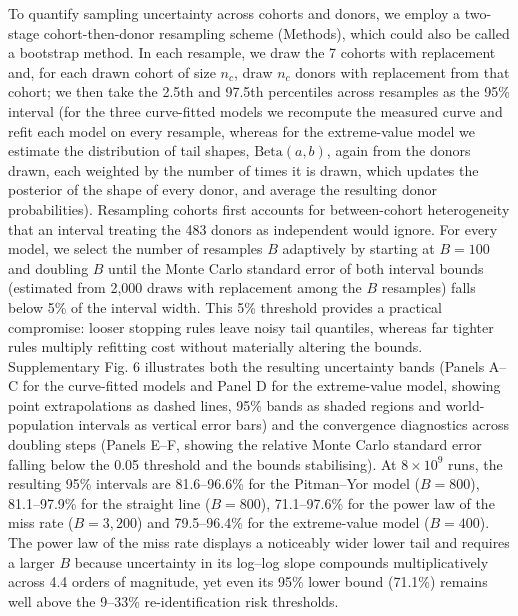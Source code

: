 \documentclass[11pt,a4paper]{article}
\begin{document}
To quantify sampling uncertainty across cohorts and donors, we employ a two-stage cohort-then-donor resampling scheme (Methods), which could also be called a bootstrap method. In each resample, we draw the 7 cohorts with replacement and, for each drawn cohort of size $n_c$, draw $n_c$ donors with replacement from that cohort; we then take the 2.5th and 97.5th percentiles across resamples as the 95\% interval (for the three curve-fitted models we recompute the measured curve and refit each model on every resample, whereas for the extreme-value model we estimate the distribution of tail shapes, $\mathrm{Beta}(a, b)$, again from the donors drawn, each weighted by the number of times it is drawn, which updates the posterior of the shape of every donor, and average the resulting donor probabilities). Resampling cohorts first accounts for between-cohort heterogeneity that an interval treating the 483 donors as independent would ignore. For every model, we select the number of resamples $B$ adaptively by starting at $B = 100$ and doubling $B$ until the Monte Carlo standard error of both interval bounds (estimated from 2,000 draws with replacement among the $B$ resamples) falls below 5\% of the interval width. This 5\% threshold provides a practical compromise: looser stopping rules leave noisy tail quantiles, whereas far tighter rules multiply refitting cost without materially altering the bounds. Supplementary Fig. 6 illustrates both the resulting uncertainty bands (Panels A--C for the curve-fitted models and Panel D for the extreme-value model, showing point extrapolations as dashed lines, 95\% bands as shaded regions and world-population intervals as vertical error bars) and the convergence diagnostics across doubling steps (Panels E--F, showing the relative Monte Carlo standard error falling below the 0.05 threshold and the bounds stabilising). At $8\times10^9$ runs, the resulting 95\% intervals are 81.6--96.6\% for the Pitman--Yor model ($B = 800$), 81.1--97.9\% for the straight line ($B = 800$), 71.1--97.6\% for the power law of the miss rate ($B = 3{,}200$) and 79.5--96.4\% for the extreme-value model ($B = 400$). The power law of the miss rate displays a noticeably wider lower tail and requires a larger $B$ because uncertainty in its log--log slope compounds multiplicatively across 4.4 orders of magnitude, yet even its 95\% lower bound (71.1\%) remains well above the 9--33\% re-identification risk thresholds.
\end{document}
